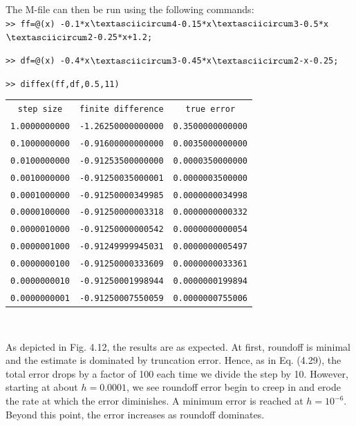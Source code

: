 \documentclass[../main.tex]{subfiles}
\begin{document}
\begin{example}
    \noindent
    The M-file can then be run using the following commands:\\
  
    \texttt{\noindent >> ff=@(x) -0.1*x$\textasciicircum$4-0.15*x$\textasciicircum$3-0.5*x$\textasciicircum$2-0.25*x+1.2;}
  
    \texttt{\noindent >> df=@(x) -0.4*x$\textasciicircum$3-0.45*x$\textasciicircum$2-x-0.25;}
  
    \texttt{\noindent >> diffex(ff,df,0.5,11)}\\
    

\begin{tabular}{c c c}
    \texttt{step size} & \texttt{finite difference} & \texttt{true error}\\
    \texttt{1.0000000000} & \texttt{-1.26250000000000} & \texttt{0.3500000000000}\\
    \texttt{0.1000000000} & \texttt{-0.91600000000000} & \texttt{0.0035000000000}\\
    \texttt{0.0100000000} & \texttt{-0.91253500000000} & \texttt{0.0000350000000}\\
    \texttt{0.0010000000} & \texttt{-0.91250035000001} & \texttt{0.0000003500000}\\
    \texttt{0.0001000000} & \texttt{-0.91250000349985} & \texttt{0.0000000034998}\\
    \texttt{0.0000100000} & \texttt{-0.91250000003318} & \texttt{0.0000000000332}\\
    \texttt{0.0000010000} & \texttt{-0.91250000000542} & \texttt{0.0000000000054}\\
    \texttt{0.0000001000} & \texttt{-0.91249999945031} & \texttt{0.0000000005497}\\
    \texttt{0.0000000100} & \texttt{-0.91250000333609} & \texttt{0.0000000033361}\\
    \texttt{0.0000000010} & \texttt{-0.91250001998944} & \texttt{0.0000000199894}\\
    \texttt{0.0000000001} & \texttt{-0.91250007550059} & \texttt{0.0000000755006}
\end{tabular}\\
\bigskip

    As depicted in Fig. 4.12, the results are as expected. At first, roundoff is minimal and the
    estimate is dominated by truncation error. Hence, as in Eq. (4.29), the total error drops by a factor
    of 100 each time we divide the step by 10. However, starting at about $h = 0.0001$, we see
    roundoff error begin to creep in and erode the rate at which the error diminishes. A minimum
    error is reached at $h = 10^{-6}$. Beyond this point, the error increases as roundoff dominates.
    

\end{example}
\end{document}
